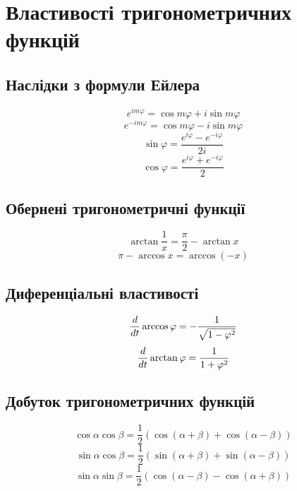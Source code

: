 \chapter{Властивості тригонометричних функцій}
\label{ch:trigonometric}

\section{Наслідки з формули Ейлера}
%
\begin{equation}
e^{im \varphi} = \cos m \varphi + i \sin m \varphi
\end{equation}
%
\begin{equation}
e^{-im \varphi} = \cos m \varphi - i \sin m \varphi
\end{equation}
%
\begin{equation}
\sin \varphi = \frac{e^{i \varphi} - e^{- i \varphi}}{2i}
\end{equation}
%
\begin{equation}
\cos \varphi = \frac{e^{i \varphi} + e^{- i \varphi}}{2}
\end{equation}
%
\section{Обернені тригонометричні функції}
%
\begin{equation}
\arctan \frac{1}{x} = \frac{\pi}{2} - \arctan x
\end{equation}
%
\begin{equation}
\pi - \arccos x = \arccos (-x)
\end{equation}
%
\section{Диференціальні властивості}
%
\begin{equation}
\frac{d }{d t} \arccos \varphi = - \frac{1}{ \sqrt{1 - \varphi^2} }
\end{equation}
%
\begin{equation}
\frac{d }{d t} \arctan \varphi = \frac{1}{1 + \varphi^2}
\end{equation}
%
\section{Добуток тригонометричних функцій}
%
\begin{equation}
\cos \alpha \cos \beta = \frac{1}{2} 
\left(  \cos (\alpha + \beta) + \cos (\alpha - \beta) \right)
\end{equation}
%
\begin{equation}
\sin \alpha \cos \beta = \frac{1}{2} 
\left( \sin (\alpha + \beta) + \sin (\alpha - \beta) \right)
\end{equation}
%
\begin{equation}
\sin \alpha \sin \beta = \frac{1}{2} 
\left( \cos (\alpha - \beta) - \cos (\alpha + \beta) \right)
\end{equation}
%
